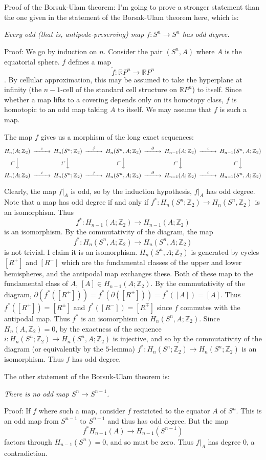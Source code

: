 \documentclass[12pt]{article}
\begin{document}
\newcommand{\Z}{\mathbb{Z}}
\newcommand{\Zt}{\Z_2}
Proof of the Borsuk-Ulam theorem:  I'm going to prove a stronger statement than the one given in 
the statement of the Borsak-Ulam theorem here, which is:

{\em Every odd (that is, antipode-preserving) map $f:S^n\to S^n$ has odd degree.}

Proof: We go by induction on $n$.  Consider the pair $(S^n,A)$ where $A$ is the equatorial sphere.  
$f$ defines a map $$\tilde{f}:\mathbb{R}P^n\to\mathbb{R}P^n$$.  By cellular approximation, this may be 
assumed to take the hyperplane at infinity (the $n-1$-cell of the standard cell structure on 
$\mathbb{R}P^n$) to itself.  Since whether a map lifts to a covering depends only on its homotopy 
class, $f$ is homotopic to an odd map taking $A$ to itself.  We may assume that $f$ is such a map.

The map $f$ gives us a morphism of the long exact sequences:
$$\begin{CD}
H_n(A;\Zt)@>i>> H_n(S^n;\Zt)@>j>> H_n(S^n,A;\Zt)@>\partial>> H_{n-1}(A;\Zt)
@>i>> H_{n-1}(S^n,A;\Zt)\\
@Vf^*VV @Vf^*VV @Vf^*VV @Vf^*VV @Vf^*VV \\
H_n(A;\Zt)@>i>> H_n(S^n;\Zt)@>j>> H_n(S^n,A;\Zt)@>\partial>> H_{n-1}(A;\Zt)
@>i>> H_{n-1}(S^n,A;\Zt)\\
\end{CD}$$

Clearly, the map $f|_A$ is odd, so by the induction hypothesis, $f|_A$ has odd degree.
Note that a map has odd degree if and only if $f^*:H_n(S^n;\Zt)\to H_n(S^n,\Zt)$ is an 
isomorphism.    Thus $$f^*:H_{n-1}(A;\Zt)\to H_{n-1}(A;\Zt)$$ is an isomorphism.
By the commutativity of the diagram, the map $$f^*:H_n(S^n,A;\Zt)\to H_n(S^n,A;\Zt)$$ is
not trivial.  I claim it is an isomorphism.  $H_n(S^n,A;\Zt)$ is generated by cycles $[R^+]$ and 
$[R^-]$ which are the fundamental classes of the upper and lower hemispheres, and the antipodal 
map exchanges these.  Both of these map to the fundamental class of $A$, 
$[A]\in H_{n-1}(A;\Zt)$.  By the commutativity of the diagram, 
$\partial(f^*([R^\pm]))=f^*(\partial([R^\pm]))=f^*([A])=[A]$.  Thus $f^*([R^+])=[R^\pm]$ and $f^*([R^-])
=[R^\mp]$ since $f$ commutes with the antipodal map.  Thus $f^*$ is an isomorphism on
$H_n(S^n,A;\Zt)$.  Since $H_n(A,\Zt)=0$, by the exactness of the sequence $i:H_n(S^n;\Zt)
\to H_n(S^n,A;\Zt)$ is injective, and so by the commutativity of the diagram (or equivalently
by the $5$-lemma) $f^*:H_n(S^n;\Zt)\to H_n(S^n;\Zt)$ is an isomorphism.  Thus
$f$ has odd degree.

The other statement of the Borsuk-Ulam theorem is:

{\em There is no odd map $S^n\to S^{n-1}$.}

Proof: If $f$ where such a map, consider $f$ restricted to the equator $A$ of $S^n$.  This is an odd
map from $S^{n-1}$ to $S^{n-1}$ and thus has odd degree.  But the map 
$$f^*H_{n-1}(A)\to H_{n-1}(S^{n-1})$$ factors through $H_{n-1}(S^n)=0$, and so must be zero. Thus $f|_A$ has degree 0, a
contradiction.
\end{document}
